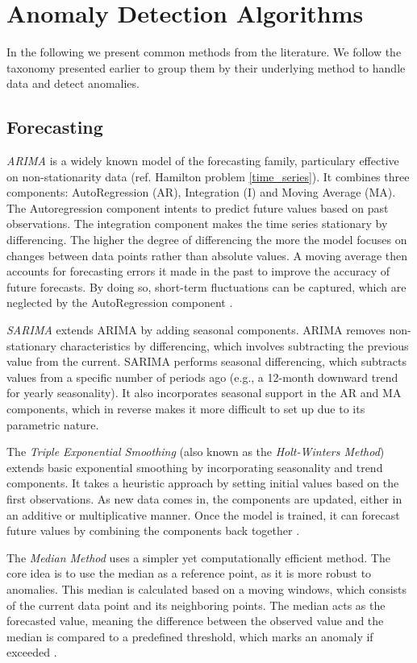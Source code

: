 \section{Anomaly Detection Algorithms}
In the following we present common methods from the literature. We follow the taxonomy presented earlier to group them by their underlying method to handle data and detect anomalies.

\subsection{Forecasting}
\textit{ARIMA} is a widely known model of the forecasting family, particulary effective on non-stationarity data (ref. Hamilton problem \ref{time_series}). It combines three components: AutoRegression (AR), Integration (I) and Moving Average (MA). 
The Autoregression component intents to predict future values based on past observations. The integration component makes the time series stationary by differencing. The higher the degree of differencing the more the model focuses on changes between data points rather than absolute values. A moving average then accounts for forecasting errors it made in the past to improve the accuracy of future forecasts. By doing so, short-term fluctuations can be captured, which are neglected by the AutoRegression component \cite{ARIMA}. 

\textit{SARIMA} extends ARIMA by adding seasonal components. ARIMA removes non-stationary characteristics by differencing, which involves subtracting the previous value from the current. SARIMA performs seasonal differencing, which subtracts values from a specific number of periods ago (e.g., a 12-month downward trend for yearly seasonality). It also incorporates seasonal support in the AR and MA components, which in reverse makes it more difficult to set up due to its parametric nature. 

The \textit{Triple Exponential Smoothing} (also known as the \textit{Holt-Winters Method}) extends basic exponential smoothing by incorporating seasonality and trend components. It takes a heuristic approach by setting initial values based on the first observations. As new data comes in, the components are updated, either in an additive or multiplicative manner. Once the model is trained, it can forecast future values by combining the components back together \cite{Triple_ES}.

The \textit{Median Method} uses a simpler yet computationally efficient method. The core idea is to use the median as a reference point, as it is more robust to anomalies. This median is calculated based on a moving windows, which consists of the current data point and its neighboring points. The median acts as the forecasted value, meaning the difference between the observed value and the median is compared to a predefined threshold, which marks an anomaly if exceeded \cite{MedianMethod}.

